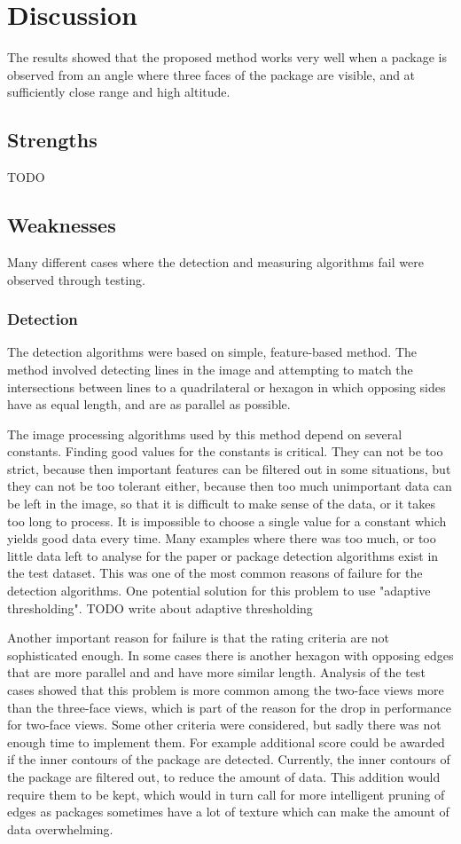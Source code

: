 \chapter{Discussion}
The results showed that the proposed method works very well when a package is observed from an angle where three faces of the package are visible, and at sufficiently close range and high altitude.

\section{Strengths}
TODO %

\section{Weaknesses}
Many different cases where the detection and measuring algorithms fail were observed through testing.

\subsection{Detection}
The detection algorithms were based on simple, feature-based method. The method involved detecting lines in the image and attempting to match the intersections between lines to a quadrilateral or hexagon in which opposing sides have as equal length, and are as parallel as possible.

The image processing algorithms used by this method depend on several constants.
Finding good values for the constants is critical.
They can not be too strict, because then important features can be filtered out in some situations, but they can not be too tolerant either, because then too much unimportant data can be left in the image, so that it is difficult to make sense of the data, or it takes too long to process.
It is impossible to choose a single value for a constant which yields good data every time.
Many examples where there was too much, or too little data left to analyse for the paper or package detection algorithms exist in the test dataset.
This was one of the most common reasons of failure for the detection algorithms.
One potential solution for this problem to use "adaptive thresholding". TODO write about adaptive thresholding %

Another important reason for failure is that the rating criteria are not sophisticated enough.
In some cases there is another hexagon with opposing edges that are more parallel and and have more similar length.
Analysis of the test cases showed that this problem is more common among the two-face views more than the three-face views, which is part of the reason for the drop in performance for two-face views.
Some other criteria were considered, but sadly there was not enough time to implement them.
For example additional score could be awarded if the inner contours of the package are detected.
Currently, the inner contours of the package are filtered out, to reduce the amount of data.
This addition would require them to be kept, which would in turn call for more intelligent pruning of edges as packages sometimes have a lot of texture which can make the amount of data overwhelming.

